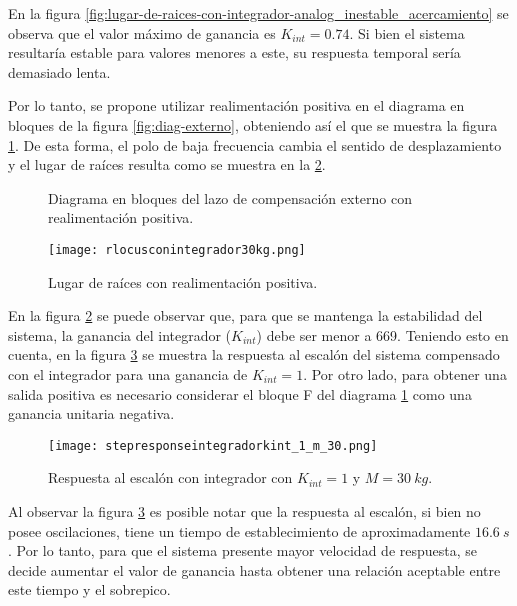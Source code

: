 En la figura \ref{fig:lugar-de-raices-con-integrador-analog_inestable_acercamiento} se observa que el valor máximo de ganancia es $K_{int}=0.74$. Si bien el sistema resultaría estable para valores menores a este, su respuesta temporal sería demasiado lenta. 

Por lo tanto, se propone utilizar realimentación positiva en el diagrama en bloques de la figura \ref{fig:diag-externo}, obteniendo así el que se muestra la figura \ref{fig:diag-externo_real_positiva}. De esta forma, el polo de baja frecuencia cambia el sentido de desplazamiento y el lugar de raíces resulta como se muestra en la \ref{fig:lugar-de-raices-con-integrador-analog}.


\begin{figure}[H]
	\centering
	
	\caption{Diagrama en bloques del lazo de compensación externo con realimentación positiva.}	
	\label{fig:diag-externo_real_positiva}
\end{figure}


\begin{figure}[H]
	\centering
	\texttt{[image: rlocusconintegrador30kg.png]}
	\caption{Lugar de raíces con realimentación positiva.}
	\label{fig:lugar-de-raices-con-integrador-analog}
\end{figure}
 
\noindent En la figura \ref{fig:lugar-de-raices-con-integrador-analog} se puede observar que, para que se mantenga la estabilidad del sistema, la ganancia del integrador ($K_{int}$) debe ser menor a 669. Teniendo esto en cuenta, en la figura \ref{fig:respuesta-al-escalon-con-k-1-M-30-analog} se muestra la respuesta al escalón del sistema compensado con el integrador para una ganancia de $K_{int}=1$. Por otro lado, para obtener una salida positiva es necesario considerar el bloque F del diagrama \ref{fig:diag-externo_real_positiva} como una ganancia unitaria negativa.

\begin{figure}[H]
	\centering
	\texttt{[image: stepresponseintegradorkint\_1\_m\_30.png]}
	\caption{Respuesta al escalón con integrador con $K_{int} =1$ y $M=30\:kg$.}
	\label{fig:respuesta-al-escalon-con-k-1-M-30-analog}
\end{figure}

Al observar la figura \ref{fig:respuesta-al-escalon-con-k-1-M-30-analog} es posible notar que la respuesta al escalón, si bien no posee oscilaciones, tiene un tiempo de establecimiento de aproximadamente $16.6 \:s$. Por lo tanto, para que el sistema presente mayor velocidad de respuesta, se decide aumentar el valor de ganancia hasta obtener una relación aceptable entre este tiempo y el sobrepico.



